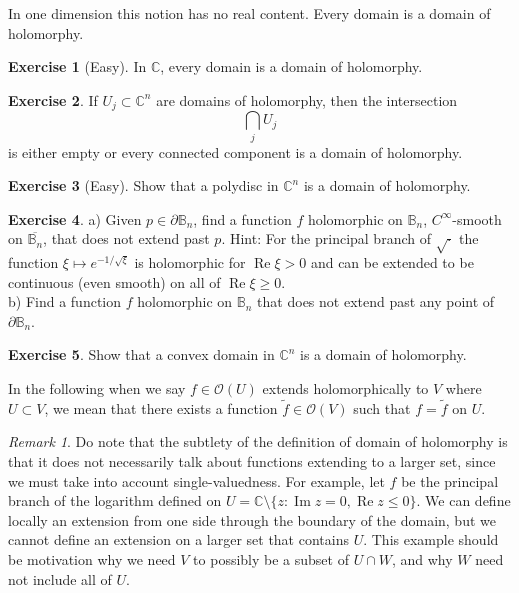 \documentclass[12pt,openany]{book}
\renewcommand{\Re}{\operatorname{Re}}
\renewcommand{\Im}{\operatorname{Im}}
\newcommand{\C}{{\mathbb{C}}}
\newcommand{\bB}{{\mathbb{B}}}
\newcommand{\sO}{{\mathcal{O}}}
\theoremstyle{plain}
\theoremstyle{remark}
\newtheorem{remark}[thm]{Remark}
\theoremstyle{definition}
\newenvironment{exbox}{%
    \def\FrameCommand{\vrule width 1pt \relax\hspace {10pt}}%
    \MakeFramed {\advance \hsize -\width \FrameRestore }%
}{%
    \endMakeFramed
}
\theoremstyle{exercise}
\newtheorem{exercise}{Exercise}[section]
\theoremstyle{example}
\begin{document}
In one dimension this notion has no real content.  Every domain is a domain
of holomorphy.

\begin{exbox}
\begin{exercise}[Easy]
In $\C$, every domain is a domain of holomorphy.
\end{exercise}

\begin{exercise}
If $U_j \subset \C^n$ are domains of holomorphy, then the intersection
\begin{equation*}
\bigcap_{j} U_j
\end{equation*}
is either empty or every connected component is a domain of holomorphy.
\end{exercise}

\begin{exercise}[Easy]
Show that a polydisc in $\C^n$ is a domain of holomorphy.
\end{exercise}

\begin{exercise}
a) Given $p \in \partial \bB_n$, find a function $f$ holomorphic on
$\bB_n$,
$C^\infty$-smooth on $\overline{\bB_n}$, that does not extend past $p$.
Hint: For the principal branch of $\sqrt{\cdot}$ the function $\xi \mapsto
e^{-1/\sqrt{\xi}}$ is holomorphic for $\Re \xi > 0$ and can be extended to
be continuous (even smooth) on all of $\Re \xi \geq 0$.\\
b) Find a function $f$ holomorphic on $\bB_n$
that does not extend past any point of
$\partial \bB_n$.
\end{exercise}

\begin{exercise}
Show that a convex domain in $\C^n$ is a domain of holomorphy.
\end{exercise}
\end{exbox}

In the following when we say $f \in \sO(U)$ extends holomorphically to $V$ where
$U \subset V$, we mean that there
exists a function $\widetilde{f} \in \sO(V)$ such that $f = \widetilde{f}$ on
$U$.

\begin{remark}
Do note that the subtlety of the definition of domain of holomorphy is that it does not
necessarily talk about functions extending to a larger set, since we must
take into account single-valuedness.  For example, let $f$ be the principal branch
of the logarithm defined on $U = \C \setminus \{ z : \Im z = 0, \Re z \leq 0
\}$.  We can define locally an extension from one side through the boundary
of the domain, but we cannot define an extension on a larger set that
contains $U$.  This example should be motivation why we need $V$ to possibly
be a subset of $U \cap W$, and why $W$ need not include all of $U$.
\end{remark}
\end{document}
